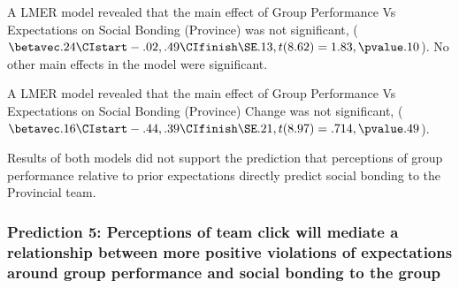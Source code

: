 




A LMER model revealed that the main effect of Group Performance Vs Expectations on Social Bonding (Province) was not significant, ($\betavec .24 \CIstart -.02, .49 \CIfinish \SE .13, t(8.62) = 1.83, \pvalue .10$). No other main effects in the model were significant.

 A LMER model revealed that the main effect of Group Performance Vs Expectations on Social Bonding (Province) Change was not significant, ($\betavec .16 \CIstart -.44, .39 \CIfinish \SE .21, t(8.97) = .714, \pvalue .49$).

Results of both models did not support the prediction that perceptions of group performance relative to prior expectations directly predict social bonding to the Provincial team.



\subsubsection{Prediction 5: Perceptions of team click will mediate a relationship between more positive violations of expectations around group performance and social bonding to the group}

